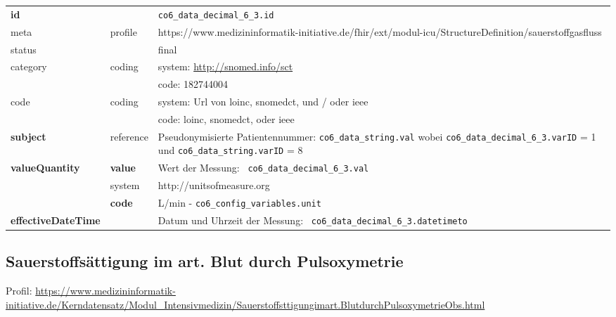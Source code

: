 \begin{longtable}{|l|l|p{7.5cm}|}
        \hline
        \rowcolor{lightgray} \multicolumn{3}{|l|}{Data Mapping (inhaltlich)} \\ \hline
        \textbf{id} &  & \texttt{co6\_data\_decimal\_6\_3.id} \\ \hline
	meta & profile & https://www.medizininformatik-initiative.de/fhir/ext/modul-icu/StructureDefinition/sauerstoffgasfluss \\ \hline 
	status &  & final   \\ \hline 
	category & coding & system: \url{http://snomed.info/sct} \\
\cline{3-3}
	& & code: 182744004 \\ \hline
	code & coding & system: Url von \ac{loinc}, \ac{snomedct}, und / oder \ac{ieee} \\ 
	\cline{3-3} 
	 &  & code: \ac{loinc}, \ac{snomedct}, oder \ac{ieee} \\ \hline
	 \textbf{subject} & reference & Pseudonymisierte Patientennummer: \texttt{co6\_data\_string.val} wobei \texttt{co6\_data\_decimal\_6\_3.varID} = 1 und \texttt{co6\_data\_string.varID} = 8 \\ \hline
	 \textbf{valueQuantity}  & \textbf{value} & Wert der Messung: \texttt{
co6\_data\_decimal\_6\_3.val} \\
        \cline{2-3}
         & system & http://unitsofmeasure.org \\
         \cline{2-3}
         & \textbf{code} & L/min - \texttt{co6\_config\_variables.unit} \\ \hline
     \textbf{effectiveDateTime}  & & Datum und Uhrzeit der Messung: \texttt{
co6\_data\_decimal\_6\_3.datetimeto} \\
    \hline
\end{longtable}


\subsection{Sauerstoffsättigung im art. Blut durch Pulsoxymetrie} 
Profil: \url{https://www.medizininformatik-initiative.de/Kerndatensatz/Modul_Intensivmedizin/Sauerstoffsttigungimart.BlutdurchPulsoxymetrieObs.html}


